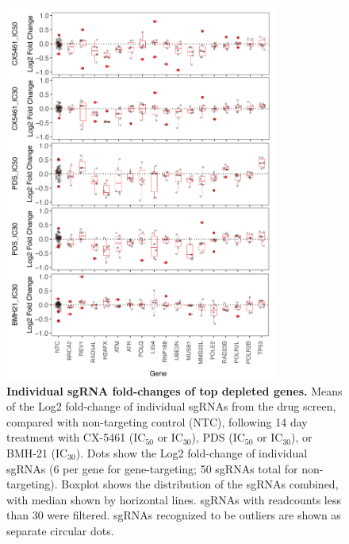 \begin{figure}
    \centering
    \includegraphics[width=0.8\textwidth]{supplement/figures/sgRNABoxplots}
    \caption[Individual sgRNA fold-changes of top depleted genes]
            {\textbf{Individual sgRNA fold-changes of top depleted genes.} Means of the Log2 fold-change of individual sgRNAs from the drug screen, compared with non-targeting control (NTC), following 14 day treatment with CX-5461 (IC$_{50}$ or IC$_{30}$), PDS (IC$_{50}$ or IC$_{30}$), or BMH-21 (IC$_{30}$). Dots show the Log2 fold-change of individual sgRNAs (6 per gene for gene-targeting; 50 sgRNAs total for non-targeting). Boxplot shows the distribution of the sgRNAs combined, with median shown by horizontal lines.  sgRNAs with readcounts less than 30 were filtered. sgRNAs recognized to be outliers are shown as separate circular dots.
            }
    \label{sfig:sgrna_boxplots}
\end{figure}     

